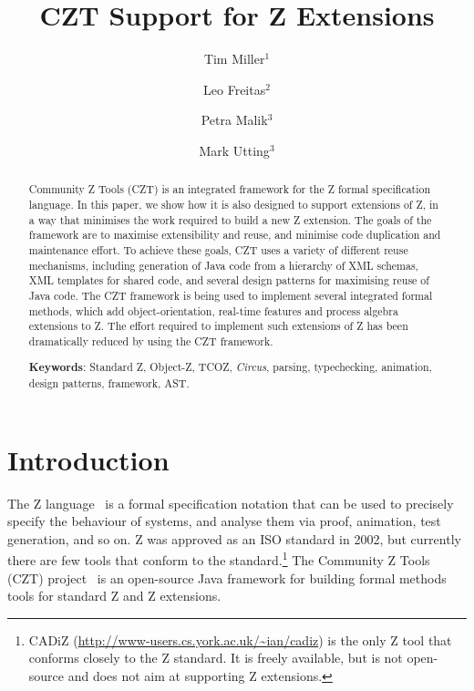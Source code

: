 \documentclass{llncs}
\newcommand{\Circus}{{\sf\slshape Circus}}
\begin{document}
\title{CZT Support for Z Extensions}
\author{Tim Miller$^1$ \and Leo Freitas$^2$ \and Petra Malik$^3$ \and Mark Utting$^3$}


\maketitle


\begin{abstract}
  Community Z Tools (CZT) is an integrated
  framework for the Z formal specification language.  In this
  paper, we show how it is also designed to support extensions
  of Z, in a way that minimises the work required to build a
  new Z extension.  The goals of the framework are to maximise
  extensibility and reuse, and minimise code duplication and
  maintenance effort.  To achieve these goals, CZT uses a variety of
  different reuse mechanisms, including generation of Java
  code from a hierarchy of XML schemas, XML templates for shared
  code, and several design patterns for maximising reuse of Java
  code.
  The CZT framework is being used to implement several integrated
  formal methods, which add object-orientation, real-time features
  and process algebra extensions to Z.  The effort required to
  implement such extensions of Z has been dramatically reduced
  by using the CZT framework.

  \noindent
  \textbf{Keywords}: Standard Z, Object-Z, TCOZ, \Circus, parsing,
     typechecking, animation, design patterns, framework, AST.
\end{abstract}

\section{Introduction} \label{sec:intro}

  The Z language~\cite{isoz} is a formal specification notation that
  can be used to precisely specify the behaviour of systems, and
  analyse them via proof, animation, test generation, and so on.
  Z was approved as an ISO standard in 2002, but currently there are few
  tools that conform to the standard.\footnote{CADiZ
  (\url{http://www-users.cs.york.ac.uk/~ian/cadiz}) is the only Z tool
  that conforms closely to the Z standard.  It is freely available,
  but is not open-source and does not aim at supporting Z extensions.}
  The Community Z Tools (CZT) project~\cite{czt} is an open-source Java
  framework for building formal methods tools for standard Z and Z extensions.
\end{document}
